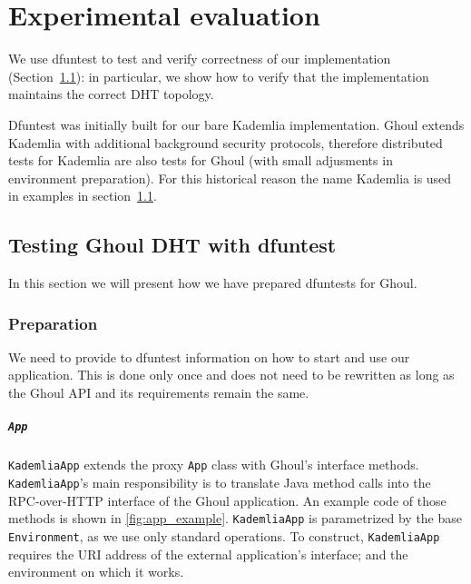\chapter{Experimental evaluation}
\label{ch:evaluation}

We use dfuntest to test and verify correctness of our implementation
(Section~\ref{sec:exampl-test-kademl}): in particular, we show how to verify
that the implementation maintains the correct DHT topology.

Dfuntest was initially built for our bare Kademlia implementation.
Ghoul extends Kademlia with additional background security protocols, therefore distributed tests for Kademlia are also tests for Ghoul (with small adjusments in environment preparation).
For this historical reason the name Kademlia is used in examples in section~\ref{sec:exampl-test-kademl}.
\section{Testing Ghoul DHT with dfuntest}\label{sec:exampl-test-kademl}
In this section we will present how we have prepared dfuntests for Ghoul.

\subsection{Preparation}
We need to provide to dfuntest information on how to start and use our
application. This is done only once and does not need to be rewritten as long as
the Ghoul API and its requirements remain the same.

\paragraph{\texttt{App}} 
\texttt{KademliaApp} extends the proxy \texttt{App} class with Ghoul's interface methods.
\texttt{KademliaApp}'s main responsibility is to translate Java method calls into the RPC-over-HTTP interface of the Ghoul application.
An example code of those methods is shown in \ref{fig:app_example}.
\texttt{KademliaApp} is parametrized by the base \texttt{Environment}, as we use only standard operations.
To construct, \texttt{KademliaApp} requires the URI address of the external
application's interface; and the environment on which it works.

